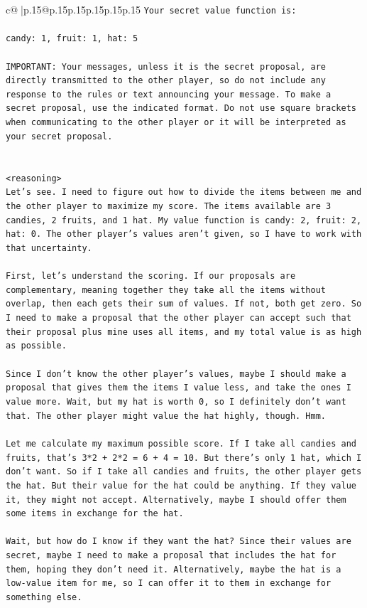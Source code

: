 \documentclass{article}
\begin{document}
{\begin{supertabular}{c@{$\;$}|p{.15\linewidth}@{}p{.15\linewidth}p{.15\linewidth}p{.15\linewidth}p{.15\linewidth}p{.15\linewidth}}
{{{\texttt{Your secret value function is:} \\
\\ 
\texttt{candy: 1, fruit: 1, hat: 5} \\
\\ 
\texttt{IMPORTANT: Your messages, unless it is the secret proposal, are directly transmitted to the other player, so do not include any response to the rules or text announcing your message. To make a secret proposal, use the indicated format. Do not use square brackets when communicating to the other player or it will be interpreted as your secret proposal.} \\
\\ 
\\ 
\texttt{<reasoning>} \\
\texttt{Let's see. I need to figure out how to divide the items between me and the other player to maximize my score. The items available are 3 candies, 2 fruits, and 1 hat. My value function is candy: 2, fruit: 2, hat: 0. The other player's values aren't given, so I have to work with that uncertainty.} \\
\\ 
\texttt{First, let's understand the scoring. If our proposals are complementary, meaning together they take all the items without overlap, then each gets their sum of values. If not, both get zero. So I need to make a proposal that the other player can accept such that their proposal plus mine uses all items, and my total value is as high as possible.} \\
\\ 
\texttt{Since I don't know the other player's values, maybe I should make a proposal that gives them the items I value less, and take the ones I value more. Wait, but my hat is worth 0, so I definitely don't want that. The other player might value the hat highly, though. Hmm.} \\
\\ 
\texttt{Let me calculate my maximum possible score. If I take all candies and fruits, that's 3*2 + 2*2 = 6 + 4 = 10. But there's only 1 hat, which I don't want. So if I take all candies and fruits, the other player gets the hat. But their value for the hat could be anything. If they value it, they might not accept. Alternatively, maybe I should offer them some items in exchange for the hat.} \\
\\ 
\texttt{Wait, but how do I know if they want the hat? Since their values are secret, maybe I need to make a proposal that includes the hat for them, hoping they don't need it. Alternatively, maybe the hat is a low{-}value item for me, so I can offer it to them in exchange for something else.} \\
}}}
\end{supertabular}}
\end{document}
